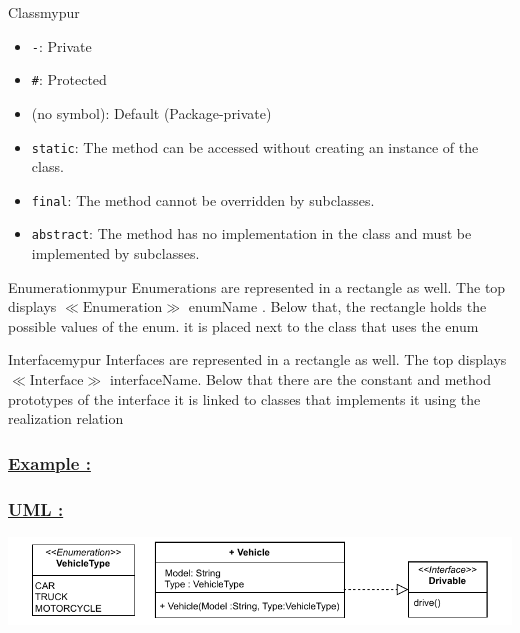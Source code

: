 \begin{prettyBox}{Class}{mypur}
\begin{itemize}
\begin{itemize}
\begin{itemize}
                \item \texttt{-}: Private
                \item \texttt{\#}: Protected
                \item (no symbol): Default (Package-private)
                \item \texttt{static}: The method can be accessed without creating an instance of the class.
                \item \texttt{final}: The method cannot be overridden by subclasses.
                \item \texttt{abstract}: The method has no implementation in the class and must be implemented by subclasses.
            \end{itemize}
        \end{itemize}
\end{itemize}
\end{prettyBox}
\vspace{0.15cm}


\begin{prettyBox}{Enumeration}{mypur}
Enumerations are represented in a rectangle as well. The top displays \(\ll\text{Enumeration}\gg\)
 enumName . Below that, the rectangle holds the possible values of the enum.
it is placed next to the class that uses the enum
\end{prettyBox}


\vspace{0.15cm}
\begin{prettyBox}{Interface}{mypur}
Interfaces are represented in a rectangle as well. The top displays \(\ll\text{Interface}\gg\) interfaceName. Below that
there are the constant and method prototypes of the interface
it is linked to classes that implements it using the realization relation
\end{prettyBox}

\vspace{0.15cm}
\subsubsection*{\underline{Example :}}

\subsubsection*{\underline{UML :}}

\includegraphics[width=\textwidth]{Chapters/Diagram/OOP/EX1/ex1.drawio.pdf}

